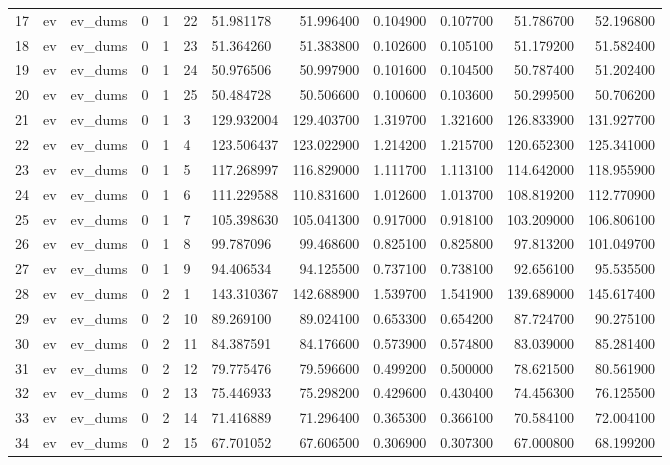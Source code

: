 \begin{tabular}{lllllllrrrrr}
17 & ev & ev_dums & 0 & 1 & 22 & 51.981178 & 51.996400 & 0.104900 & 0.107700 & 51.786700 & 52.196800 \\
18 & ev & ev_dums & 0 & 1 & 23 & 51.364260 & 51.383800 & 0.102600 & 0.105100 & 51.179200 & 51.582400 \\
19 & ev & ev_dums & 0 & 1 & 24 & 50.976506 & 50.997900 & 0.101600 & 0.104500 & 50.787400 & 51.202400 \\
20 & ev & ev_dums & 0 & 1 & 25 & 50.484728 & 50.506600 & 0.100600 & 0.103600 & 50.299500 & 50.706200 \\
21 & ev & ev_dums & 0 & 1 & 3 & 129.932004 & 129.403700 & 1.319700 & 1.321600 & 126.833900 & 131.927700 \\
22 & ev & ev_dums & 0 & 1 & 4 & 123.506437 & 123.022900 & 1.214200 & 1.215700 & 120.652300 & 125.341000 \\
23 & ev & ev_dums & 0 & 1 & 5 & 117.268997 & 116.829000 & 1.111700 & 1.113100 & 114.642000 & 118.955900 \\
24 & ev & ev_dums & 0 & 1 & 6 & 111.229588 & 110.831600 & 1.012600 & 1.013700 & 108.819200 & 112.770900 \\
25 & ev & ev_dums & 0 & 1 & 7 & 105.398630 & 105.041300 & 0.917000 & 0.918100 & 103.209000 & 106.806100 \\
26 & ev & ev_dums & 0 & 1 & 8 & 99.787096 & 99.468600 & 0.825100 & 0.825800 & 97.813200 & 101.049700 \\
27 & ev & ev_dums & 0 & 1 & 9 & 94.406534 & 94.125500 & 0.737100 & 0.738100 & 92.656100 & 95.535500 \\
28 & ev & ev_dums & 0 & 2 & 1 & 143.310367 & 142.688900 & 1.539700 & 1.541900 & 139.689000 & 145.617400 \\
29 & ev & ev_dums & 0 & 2 & 10 & 89.269100 & 89.024100 & 0.653300 & 0.654200 & 87.724700 & 90.275100 \\
30 & ev & ev_dums & 0 & 2 & 11 & 84.387591 & 84.176600 & 0.573900 & 0.574800 & 83.039000 & 85.281400 \\
31 & ev & ev_dums & 0 & 2 & 12 & 79.775476 & 79.596600 & 0.499200 & 0.500000 & 78.621500 & 80.561900 \\
32 & ev & ev_dums & 0 & 2 & 13 & 75.446933 & 75.298200 & 0.429600 & 0.430400 & 74.456300 & 76.125500 \\
33 & ev & ev_dums & 0 & 2 & 14 & 71.416889 & 71.296400 & 0.365300 & 0.366100 & 70.584100 & 72.004100 \\
34 & ev & ev_dums & 0 & 2 & 15 & 67.701052 & 67.606500 & 0.306900 & 0.307300 & 67.000800 & 68.199200 \\

\end{tabular}
